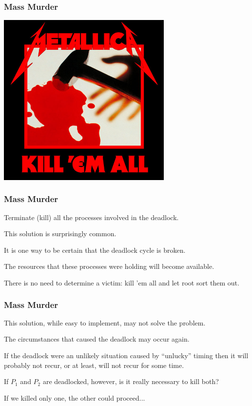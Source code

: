 \begin{frame}
	\frametitle{Mass Murder}

	\begin{center}
		\includegraphics[width=0.65\textwidth]{images/killemall.jpg}
	\end{center}

\end{frame}

\begin{frame}
	\frametitle{Mass Murder}

	Terminate (kill) all the processes involved in the deadlock.

	This solution is surprisingly common.

	It is one way to be certain that the deadlock cycle is broken.

	The resources that these processes were holding will become available.

	There is no need to determine a victim: kill 'em all and let root sort them out.

\end{frame}

\begin{frame}
	\frametitle{Mass Murder}

	This solution, while easy to implement, may not solve the problem.

	The circumstances that caused the deadlock may occur again.

	If the deadlock were an unlikely situation caused by ``unlucky'' timing then it will probably not recur, or at least, will not recur for some time.

	If $P_{1}$ and $P_{2}$ are deadlocked, however, is it really necessary to kill both?

	If we killed only one, the other could proceed...

\end{frame}


